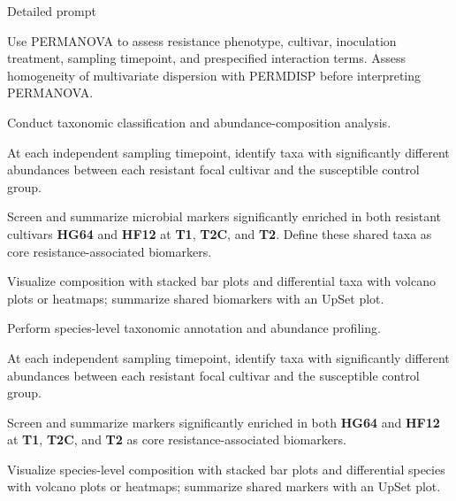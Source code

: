 \begin{promptbox}{Detailed prompt}
\begin{promptitems}
\item Use PERMANOVA to assess resistance phenotype, cultivar, inoculation
  treatment, sampling timepoint, and prespecified interaction terms. Assess
  homogeneity of multivariate dispersion with PERMDISP before interpreting
  PERMANOVA.
\end{promptitems}
\begin{promptitems}
\item Conduct taxonomic classification and abundance-composition analysis.
\item At each independent sampling timepoint, identify taxa with significantly
  different abundances between each resistant focal cultivar and the susceptible
  control group.
\item Screen and summarize microbial markers significantly enriched in both
  resistant cultivars \textbf{HG64} and \textbf{HF12} at \textbf{T1},
  \textbf{T2C}, and \textbf{T2}. Define these shared taxa as core
  resistance-associated biomarkers.
\item Visualize composition with stacked bar plots and differential taxa with
  volcano plots or heatmaps; summarize shared biomarkers with an UpSet plot.
\end{promptitems}
\tcbbreak
{}
\begin{promptitems}
\item Perform species-level taxonomic annotation and abundance profiling.
\item At each independent sampling timepoint, identify taxa with significantly
  different abundances between each resistant focal cultivar and the susceptible
  control group.
\item Screen and summarize markers significantly enriched in both \textbf{HG64}
  and \textbf{HF12} at \textbf{T1}, \textbf{T2C}, and \textbf{T2} as core
  resistance-associated biomarkers.
\item Visualize species-level composition with stacked bar plots and
  differential species with volcano plots or heatmaps; summarize shared markers
  with an UpSet plot.
\end{promptitems}
\end{promptbox}

